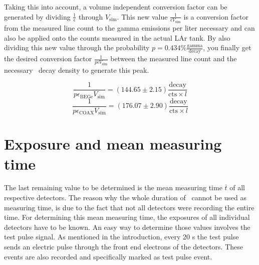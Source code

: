 \documentclass[encoding=utf8,british]{tumphthesis}
\begin{document}
Taking this into account, a volume independent conversion factor can be generated by dividing $\frac{1}{\epsilon}$ through $V_{\mathrm{sim}}$.
This new value $\frac{1}{\epsilon V_{\mathrm{sim}}}$ is a conversion factor from the measured line count to the gamma emissions per liter necessary and can also be applied onto the counts measured in the actual LAr tank.
By also dividing this new value through the probability $p=0.434\% \frac{\mathrm{gamma}} {\mathrm{decay}}$, you finally get the desired conversion factor $\frac{1}{ p\epsilon V_ {\mathrm{sim}}}$ between the measured line count and the necessary \Kr\ decay density to generate this peak. 
 
\begin{equation*}
\frac{1}{ p \epsilon_{\mathrm{BEGe}} V_{\mathrm{sim}}} = (144.65\pm2.15) \frac{\mathrm{decay}}{\mathrm{cts}\times \unit{l}}
\end{equation*}
\begin{equation*}
\frac{1}{p \epsilon_{\mathrm{COAX}} V_{\mathrm{sim}}} = (176.07\pm2.90) \frac{\mathrm{decay}}{\mathrm{cts} \times \unit{l}}
\end{equation*}



\section{Exposure and mean measuring time}
\label{sec:CalcActiv}

The last remaining value to be determined is the mean measuring time $\bar{t}$ of all respective detectors.
The reason why the whole duration of \PII\ cannot be used as measuring time, is due to the fact that not all detectors were recording the entire time.
For determining this mean measuring time, the exposures of all individual detectors have to be known.
An easy way to determine those values involves the test pulse signal.
As mentioned in the introduction, every 20 s the test pulse sends an electric pulse through the front end electrons of the detectors.
These events are also recorded and specifically marked as test pulse event. 
\\
\end{document}

